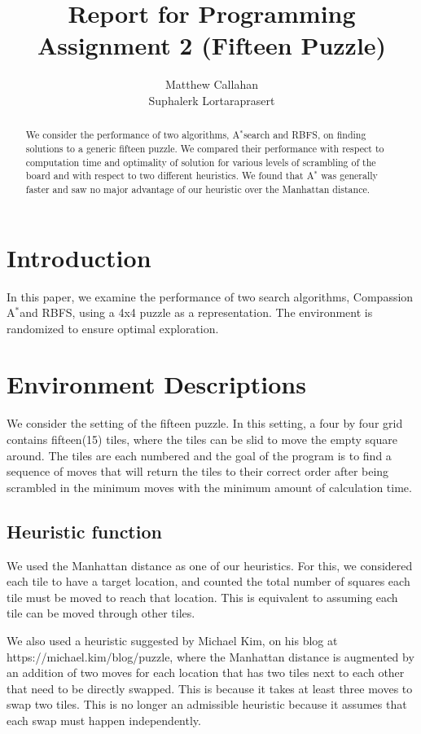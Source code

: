\documentclass{article}
\title{Report for Programming Assignment 2 (Fifteen Puzzle)}
\author{%
  Matthew Callahan\\
  \And
  Suphalerk Lortaraprasert
}
\begin{document}
\maketitle


\begin{abstract}
 We consider the performance of two algorithms, A$^*$search and RBFS, on finding solutions to a generic fifteen puzzle. We compared their performance with respect to computation time and optimality of solution for various levels of scrambling of the board and with respect to two different heuristics. We found that A$^*$ was generally faster and saw no major advantage of our heuristic over the Manhattan distance.
\end{abstract}

\section{Introduction}

In this paper, we examine the performance of two search algorithms, Compassion A$^*$and RBFS, using a 4x4 puzzle as a representation. The environment is randomized to ensure optimal exploration. 

\section{Environment Descriptions}
We consider the setting of the fifteen puzzle. In this setting, a four by four grid contains fifteen(15) tiles, where the tiles can be slid to move the empty square around. The tiles are each numbered and the goal of the program is to find a sequence of moves that will return the tiles to their correct order after being scrambled in the minimum moves with the minimum amount of calculation time. 

\subsection{Heuristic function}
We used the Manhattan distance as one of our heuristics. For this, we considered each tile to have a target location, and counted the total number of squares each tile must be moved to reach that location. This is equivalent to assuming each tile can be moved through other tiles.

We also used a heuristic suggested by Michael Kim, on his blog at https://michael.kim/blog/puzzle, where the Manhattan distance is augmented by an addition of two moves for each location that has two tiles next to each other that need to be directly swapped. This is because it takes at least three moves to swap two tiles. This is no longer an admissible heuristic because it assumes that each swap must happen independently. 
\end{document}
